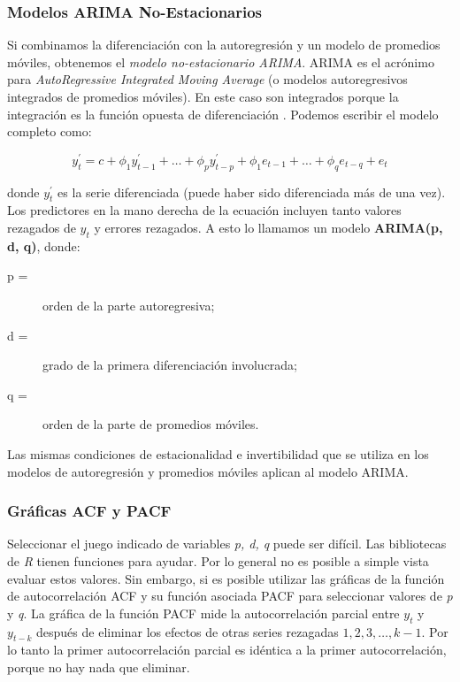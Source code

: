 \subsubsection{Modelos ARIMA No-Estacionarios}
Si combinamos la diferenciación con la autoregresión y un modelo de promedios móviles, obtenemos el \emph{modelo no-estacionario ARIMA}. ARIMA es el acrónimo para \emph{AutoRegressive Integrated Moving Average} (o modelos autoregresivos integrados de promedios móviles). En este caso son integrados porque la integración es la función opuesta de diferenciación \cite{hyndman}. Podemos escribir el modelo completo como:

\[ y_{t}^{\prime} = c + \phi_{1}y_{t-1}^{\prime} + \ldots + \phi_{p}y_{t-p}^{\prime} + \phi_{1}e_{t-1} + \ldots + \phi_{q}e_{t-q} + e_{t} \]

donde $y_{t}^{\prime}$ es la serie diferenciada (puede haber sido diferenciada más de una vez). Los predictores en la mano derecha de la ecuación incluyen tanto valores rezagados de $y_t$ y errores rezagados. A esto lo llamamos un modelo \textbf{ARIMA(p, d, q)}, donde:

\begin{description}
  \item [p = ]
  orden de la parte autoregresiva;
  \item [d = ]
  grado de la primera diferenciación involucrada;
  \item [q = ]
  orden de la parte de promedios móviles.
\end{description}

Las mismas condiciones de estacionalidad e invertibilidad que se utiliza en los modelos de autoregresión y promedios móviles aplican al modelo ARIMA.

\subsubsection{Gráficas ACF y PACF}
Seleccionar el juego indicado de variables \emph{p, d, q} puede ser difícil. Las bibliotecas de \emph{R} tienen funciones para ayudar. Por lo general no es posible a simple vista evaluar estos valores. Sin embargo, si es posible utilizar las gráficas de la función de autocorrelación ACF y su función asociada PACF para seleccionar valores de \textit{p} y \textit{q}. La gráfica de la función PACF mide la autocorrelación parcial entre $y_{t}$ y $y_{t-k}$ después de eliminar los efectos de otras series rezagadas $1, 2, 3, \ldots, k-1$. Por lo tanto la primer autocorrelación parcial es idéntica a la primer autocorrelación, porque no hay nada que eliminar.

